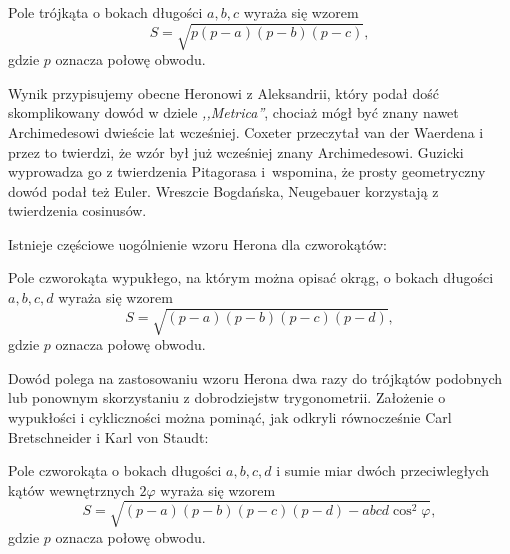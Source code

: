 %

\begin{proposition}
    Pole trójkąta o bokach długości $a, b, c$ wyraża się wzorem
    \begin{equation}
        S = \sqrt{p(p-a)(p-b)(p-c)},
    \end{equation}
    gdzie $p$ oznacza połowę obwodu.
\end{proposition}

Wynik przypisujemy obecne Heronowi z Aleksandrii, który podał dość skomplikowany dowód w dziele \emph{,,Metrica''}, chociaż mógł być znany nawet Archimedesowi dwieście lat wcześniej.
%
Coxeter \cite[s. 12]{coxeter_1991} przeczytał van der Waerdena \cite[s. 228, 277]{waerden_1961} i przez to twierdzi, że wzór był już wcześniej znany Archimedesowi.
%
Guzicki \cite[s. 165-169]{guzicki_2021} wyprowadza go z twierdzenia Pitagorasa i~wspomina, że prosty geometryczny dowód podał też Euler.
%
Wreszcie Bogdańska, Neugebauer \cite[s. 92]{neugebauer_2018} korzystają z twierdzenia cosinusów.

Istnieje częściowe uogólnienie wzoru Herona dla czworokątów:

\begin{proposition}
    Pole czworokąta wypukłego, na którym można opisać okrąg, o bokach długości $a, b, c, d$ wyraża się wzorem
    \begin{equation}
        S = \sqrt{(p-a)(p-b)(p-c)(p-d)},
    \end{equation}
    gdzie $p$ oznacza połowę obwodu.
\end{proposition}

Dowód polega na zastosowaniu wzoru Herona dwa razy do trójkątów podobnych lub ponownym skorzystaniu z dobrodziejstw trygonometrii.
Założenie o wypukłości i cykliczności można pominąć, jak odkryli równocześnie Carl Bretschneider i Karl von Staudt:
%
%

\begin{proposition}
    Pole czworokąta o bokach długości $a, b, c, d$ i sumie miar dwóch przeciwległych kątów wewnętrznych $2 \varphi$ wyraża się wzorem
    \begin{equation}
        S = \sqrt{(p-a)(p-b)(p-c)(p-d) - abcd \cos^2  \varphi},
    \end{equation}
    gdzie $p$ oznacza połowę obwodu.
\end{proposition}

